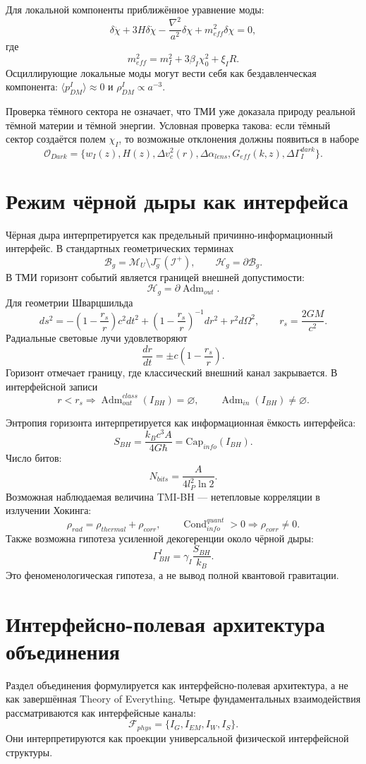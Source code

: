 \documentclass[12pt,a4paper]{article}
\DeclareMathOperator{\Adm}{Adm}
\DeclareMathOperator{\Cond}{Cond}
\newcommand{\M}{\mathcal M_U}
\begin{document}
Для локальной компоненты приближённое уравнение моды:
\[
\boxed{
\delta\ddot\chi+3H\delta\dot\chi-\frac{\nabla^2}{a^2}\delta\chi+m_{eff}^2\delta\chi=0,
}
\]
где
\[
\boxed{m_{eff}^2=m_I^2+3\beta_I\chi_0^2+\xi_I R.}
\]
Осциллирующие локальные моды могут вести себя как бездавленческая компонента: $\langle p_{DM}^{I}\rangle\approx0$ и $\rho_{DM}^{I}\propto a^{-3}$.

Проверка тёмного сектора не означает, что ТМИ уже доказала природу реальной тёмной материи и тёмной энергии. Условная проверка такова: если тёмный сектор создаётся полем $\chi_I$, то возможные отклонения должны появиться в наборе
\[
\boxed{
\mathcal O_{Dark}=\{w_I(z),H(z),\Delta v_c^2(r),\Delta\alpha_{lens},G_{eff}(k,z),\Delta\Gamma_I^{dark}\}.
}
\]

\section{Режим чёрной дыры как интерфейса}
Чёрная дыра интерпретируется как предельный причинно-информационный интерфейс. В стандартных геометрических терминах
\[
\boxed{
\mathcal B_g=\M\setminus J_g^-(\mathcal I^+),
\qquad
\mathcal H_g=\partial\mathcal B_g.
}
\]
В ТМИ горизонт событий является границей внешней допустимости:
\[
\boxed{\mathcal H_g=\partial\Adm_{out}.}
\]
Для геометрии Шварцшильда
\[
\boxed{
ds^2=-\left(1-\frac{r_s}{r}\right)c^2dt^2+\left(1-\frac{r_s}{r}\right)^{-1}dr^2+r^2d\Omega^2,
\qquad
r_s=\frac{2GM}{c^2}.
}
\]
Радиальные световые лучи удовлетворяют
\[
\boxed{\frac{dr}{dt}=\pm c\left(1-\frac{r_s}{r}\right).}
\]
Горизонт отмечает границу, где классический внешний канал закрывается. В интерфейсной записи
\[
\boxed{r<r_s\Rightarrow \Adm_{out}^{class}(I_{BH})=\varnothing,
\qquad \Adm_{in}(I_{BH})\neq\varnothing.}
\]

Энтропия горизонта интерпретируется как информационная ёмкость интерфейса:
\[
\boxed{
S_{BH}=\frac{k_Bc^3A}{4G\hbar}=\mathrm{Cap}_{info}(I_{BH}).
}
\]
Число битов:
\[
\boxed{N_{bits}=\frac{A}{4l_P^2\ln2}.}
\]
Возможная наблюдаемая величина TMI-BH — нетепловые корреляции в излучении Хокинга:
\[
\boxed{
\rho_{rad}=\rho_{thermal}+\rho_{corr},
\qquad
\Cond_{info}^{quant}>0\Rightarrow \rho_{corr}\neq0.
}
\]
Также возможна гипотеза усиленной декогеренции около чёрной дыры:
\[
\boxed{
\Gamma_{BH}^{I}=\gamma_I\frac{S_{BH}}{k_B}.
}
\]
Это феноменологическая гипотеза, а не вывод полной квантовой гравитации.

\section{Интерфейсно-полевая архитектура объединения}
Раздел объединения формулируется как интерфейсно-полевая архитектура, а не как завершённая Theory of Everything. Четыре фундаментальных взаимодействия рассматриваются как интерфейсные каналы:
\[
\boxed{
\mathcal F_{phys}=\{I_G,I_{EM},I_W,I_S\}.
}
\]
Они интерпретируются как проекции универсальной физической интерфейсной структуры.
\end{document}
